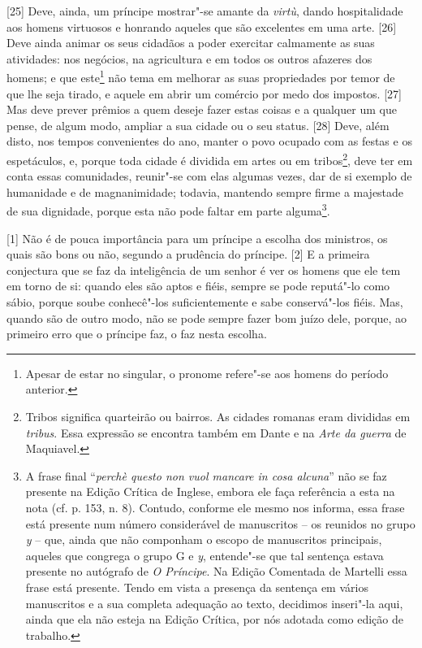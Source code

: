 {[}25{]} Deve, ainda, um príncipe mostrar"-se amante da \emph{virtù},
dando hospitalidade aos homens virtuosos e honrando aqueles que são
excelentes em uma arte. {[}26{]} Deve ainda animar os seus cidadãos a
poder exercitar calmamente as suas atividades: nos negócios, na
agricultura e em todos os outros afazeres dos homens; e que
este\footnote{Apesar de estar no singular, o pronome refere"-se aos
  homens do período anterior.} não tema em melhorar as suas propriedades
por temor de que lhe seja tirado, e aquele em abrir um comércio por medo
dos impostos. {[}27{]} Mas deve prever prêmios a quem deseje fazer estas
coisas e a qualquer um que pense, de algum modo, ampliar a sua cidade ou
o seu status. {[}28{]} Deve, além disto, nos tempos convenientes do ano,
manter o povo ocupado com as festas e os espetáculos, e, porque toda
cidade é dividida em artes ou em tribos\footnote{Tribos significa
  quarteirão ou bairros. As cidades romanas eram divididas em
  \emph{tribus}. Essa expressão se encontra também em Dante e na
  \emph{Arte da guerra} de Maquiavel.}, deve ter em conta essas
comunidades, reunir"-se com elas algumas vezes, dar de si exemplo de
humanidade e de magnanimidade; todavia, mantendo sempre firme a
majestade de sua dignidade, porque esta não pode faltar em parte
alguma\footnote{A frase final ``\emph{perchè questo non vuol mancare in
  cosa alcuna}'' não se faz presente na Edição Crítica
  de Inglese, embora ele faça referência a esta na nota (cf. p. 153, n.
  8). Contudo, conforme ele mesmo nos informa, essa frase está presente
  num número considerável de manuscritos -- os reunidos no grupo
  \emph{y} -- que, ainda que não componham o escopo de manuscritos
  principais, aqueles que congrega o grupo G e \emph{y}, entende"-se que
  tal sentença estava presente no autógrafo de \emph{O Príncipe}. Na
  Edição Comentada de Martelli essa frase está presente. Tendo em vista
  a presença da sentença em vários manuscritos e a sua completa
  adequação ao texto, decidimos inseri"-la aqui, ainda que ela não esteja
  na Edição Crítica, por nós adotada como edição de trabalho.}.


{[}1{]} Não é de pouca importância para um príncipe a escolha dos
ministros, os quais são bons ou não, segundo a prudência do príncipe.
{[}2{]} E a primeira conjectura que se faz da inteligência de um senhor
é ver os homens que ele tem em torno de si: quando eles são aptos e
fiéis, sempre se pode reputá"-lo como sábio, porque soube conhecê"-los
suficientemente e sabe conservá"-los fiéis. Mas, quando são de outro
modo, não se pode sempre fazer bom juízo dele, porque, ao primeiro erro
que o príncipe faz, o faz nesta escolha.

